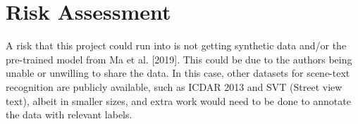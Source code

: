 \section{Risk Assessment}
\label{sec:risk_assessment}

A risk that this project could run into is not getting synthetic data and/or the pre-trained model from Ma et al. [2019]. This could be due to the authors being unable or unwilling to share the data. In this case, other datasets for scene-text recognition are publicly available, such as ICDAR 2013 and SVT (Street view text), albeit in smaller sizes, and extra work would need to be done to annotate the data with relevant labels.